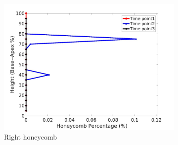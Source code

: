 \begin{figure}[H]
\begin{subfigure}{.42\linewidth}
  \includegraphics[width=\linewidth,trim={{.0\wd0} {.0\wd0} {.0\wd0} {.0\wd0}},clip]{Appendix/Image_AppexA/BaseToApex/IPF3RightLungHoneycombDiseaseAgainstHeight.jpg}
  \caption{Right honeycomb}
  \label{fig:IPF3DiseaseAgainstHeight-f}
\end{subfigure}
\begin{subfigure}{.42\linewidth}%

\end{subfigure}
\end{figure}
